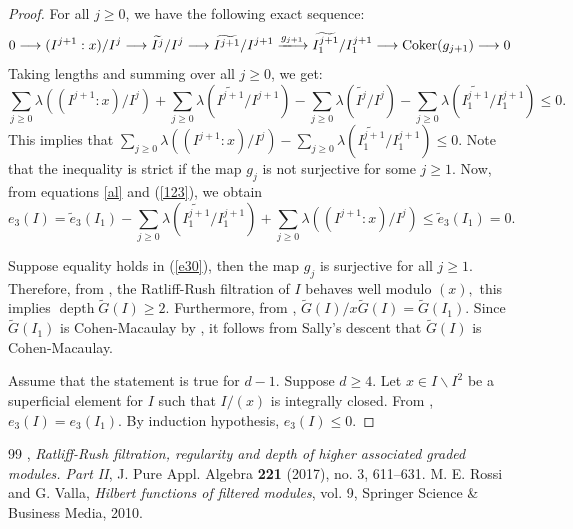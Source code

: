 \documentclass[10pt,a4paper]{amsart}
\newcommand{\depth}{\operatorname{depth}}
\newcommand{\wt}{\widetilde}
\begin{document}
\begin{proof}
 For all $j\geq 0$, we have the following exact sequence: 
\begin{equation}\label{behave}
    0\longrightarrow (I^{j+1}:x)/I^j\longrightarrow  \wt{I^j}/I^j \longrightarrow  \wt{I^{j+1}}/I^{j+1} \xlongrightarrow{g_{j+1}} \wt{{I^{j+1}_1}}/{I^{j+1}_1} \longrightarrow \mathrm{Coker}(g_{j+1}) \longrightarrow 0
\end{equation}
Taking lengths and summing over all $j \geq 0$,   we get:
\begin{equation*}
    \sum_{j\geq 0}\lambda\left((I^{j+1}:x)/I^j\right)+\sum_{j\geq 0}\lambda(\wt{I^{j+1}}/I^{j+1})-\sum_{j\geq 0}\lambda(\wt{I^j}/I^j)-\sum_{j\geq 0}\lambda\left(\wt{{I^{j+1}_1}}/{I^{j+1}_1}\right) \leq 0.
\end{equation*}
This implies that $\displaystyle\sum_{j\geq 0}\lambda\left((I^{j+1}:x)/I^j\right)-\sum_{j\geq 0}\lambda\left(\wt{{I^{j+1}_1}}/{I^{j+1}_1}\right)\leq 0.$ Note that the inequality is strict if the map $g_{j}$ is not surjective for some $j\geq 1.$
 Now, from equations \eqref{al} and (\ref{123}), we obtain 
    \begin{equation} \label{e30}
        e_3(I)=\widetilde{e}_{3}({I_1})-\sum_{j\geq 0}\lambda\left(\widetilde{{I^{j+1}_1}}/{I^{j+1}_1}\right)+\sum_{j\geq 0}\lambda\left((I^{j+1}:x)/I^{j}\right)\leq \widetilde{e}_{3}({I_1})=0.
    \end{equation}
    
    Suppose equality holds in (\ref{e30}), then the map $g_j$ is surjective for all $j\geq 1.$ Therefore, from \cite[Definition 4.4]{Part2}, the Ratliff-Rush filtration of $I$ behaves well modulo $(x),$ this implies $\depth \widetilde{G}(I) \geq 2.$ Furthermore, from \cite[Remark 4.5]{Part2}, $\widetilde{G}(I)/x\widetilde{G}(I)=\widetilde{G}({I_1}).$ Since $\widetilde{G}(I_1)$ is Cohen-Macaulay by \cite[Proposition 3.4$(iv)$]{Part2}, it follows from Sally's descent that $\widetilde{G}(I)$ is Cohen-Macaulay. 

    Assume that the statement is true for $d-1.$ Suppose $d\geq 4.$ Let $x \in I\backslash I^{2}$ be a superficial element for $I$ such that $I/(x)$ is integrally closed.
    From \cite[Proposition 1.2]{rossi2010hilbert}, $e_{3}(I)=e_{3}(I_1)$. By induction hypothesis, $e_3(I)\leq 0.$ %
\end{proof}

\begin{thebibliography}{99}
 \bysame, \emph{Ratliff-Rush filtration, regularity and depth of higher associated graded modules. Part II}, J. Pure Appl. Algebra \textbf{221} (2017), no. 3, 611–631. %
 M. E. Rossi and G. Valla, \emph{Hilbert functions of filtered modules}, vol. 9, Springer Science \& Business Media, 2010.
\end{thebibliography}
\end{document}
